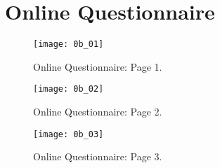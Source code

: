 \chapter{Online Questionnaire} \label{Chapter:AppendixB}

\begin{figure}[!htb]
  \centering
  \texttt{[image: 0b\_01]}
  \caption{Online Questionnaire: Page 1.}
  \label{Figure:0b_01}
\end{figure}

\begin{figure}[!htb]
  \centering
  \texttt{[image: 0b\_02]}
  \caption{Online Questionnaire: Page 2.}
  \label{Figure:0b_02}
\end{figure}

\begin{figure}[!htb]
  \centering
  \texttt{[image: 0b\_03]}
  \caption{Online Questionnaire: Page 3.}
  \label{Figure:0b_03}
\end{figure}